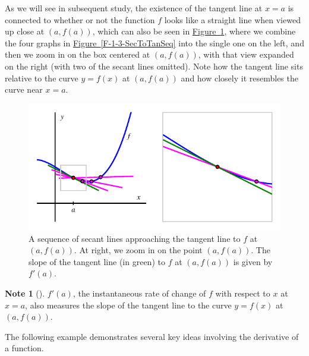 \documentclass[10pt,]{book}
\theoremstyle{plain}
\theoremstyle{definition}
\theoremstyle{definition}
\newtheorem{note}[theorem]{Note}
\theoremstyle{definition}
\theoremstyle{definition}
\theoremstyle{definition}
\numberwithin{equation}{section}
\begin{document}
As we will see in subsequent study, the existence of the tangent line at \(x = a\) is connected to whether or not the function \(f\) looks like a straight line when viewed up close at \((a,f(a))\), which can also be seen in \hyperref[F-1-3-SecToTan]{Figure~\ref{F-1-3-SecToTan}}, where we combine the four graphs in \hyperref[F-1-3-SecToTanSeq]{Figure~\ref{F-1-3-SecToTanSeq}} into the single one on the left, and then we zoom in on the box centered at \((a,f(a))\), with that view expanded on the right (with two of the secant lines omitted). Note how the tangent line sits relative to the curve \(y = f(x)\) at \((a,f(a))\) and how closely it resembles the curve near \(x = a\).
%
\leavevmode%
\begin{figure}
\centering
\includegraphics[width=0.75\linewidth]{images/1_3_SecToTan}
\caption{A sequence of secant lines approaching the tangent line to \(f\) at \((a,f(a))\).  At right, we zoom in on the point \((a,f(a))\).  The slope of the tangent line (in green) to \(f\) at \((a,f(a))\) is given by \(f'(a)\).\label{F-1-3-SecToTan}}
\end{figure}
\begin{note}[]\label{note-1}
 \(f'(a)\), the instantaneous rate of change of \(f\) with respect to \(x\) at \(x = a\), also measures the slope of the tangent line to the curve \(y = f(x)\) at \((a,f(a))\). %
\end{note}
\par
The following example demonstrates several key ideas involving the derivative of a function.%
\end{document}
